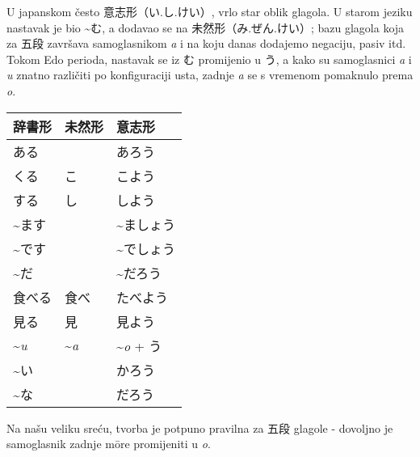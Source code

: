 
\author{Tomislav Mamić}

	
	
	U japanskom često 意志形（い.し.けい）, vrlo star oblik glagola. U starom jeziku nastavak je bio \textasciitilde む, a dodavao se na 未然形（み.ぜん.けい）; bazu glagola koja za 五段 završava samoglasnikom \textit{a} i na koju danas dodajemo negaciju, pasiv itd. Tokom Edo perioda, nastavak se iz む promijenio u う, a kako su samoglasnici \textit{a} i \textit{u} znatno različiti po konfiguraciji usta, zadnje \textit{a} se s vremenom pomaknulo prema \textit{o}.
	
	\begin{table}[h]
		\centering
		\begin{tabular}{l l l}\toprule[2pt]
			辞書形 & 未然形 & 意志形\\
			\midrule
			ある & \varnothing & あろう\\
			くる & こ & こよう\\
			する & し & しよう\\
			\midrule
			\textasciitilde ます & \varnothing & \textasciitilde ましょう\\
			\textasciitilde です & \varnothing & \textasciitilde でしょう\\
			\textasciitilde だ & \varnothing & \textasciitilde だろう\\ 
			\midrule
			食べる & 食べ & たべよう\\
			見る & 見 & 見よう\\
			\midrule
			\textasciitilde\textit{u} & \textasciitilde\textit{a} & \textasciitilde\textit{o} + う\\
			\midrule
			\textasciitilde い & \varnothing & かろう\\
			\textasciitilde な & \varnothing & だろう\\
			\bottomrule[2pt]
		\end{tabular}
	\end{table}

	Na našu veliku sreću, tvorba je potpuno pravilna za 五段 glagole - dovoljno je samoglasnik zadnje m\={o}re promijeniti u \textit{o}.
	
	
